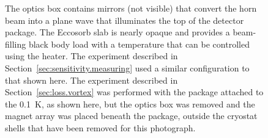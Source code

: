 \begin{figure}[ht]
{The optics box contains mirrors (not visible) that convert the horn beam into a plane wave that illuminates the top of the detector package.
The Eccosorb slab is nearly opaque and provides a beam-filling black body load with a temperature that can be controlled using the heater.
The experiment described in Section~\ref{sec:sensitivity.measuring} used a similar configuration to that shown here.
The experiment described in Section~\ref{sec:loss.vortex} was performed with the package attached to the \SI{0.1}{K}, as shown here, but the optics box was removed and the magnet array was placed beneath the package, outside the cryostat shells that have been removed for this photograph.
}
\label{fig:starcryo_cryostat_with_optics_box}
\end{figure}


